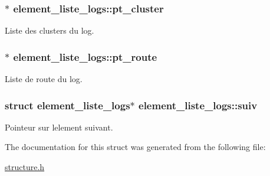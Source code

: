 \subsubsection[{\texorpdfstring{pt\+\_\+cluster}{pt_cluster}}]{$\ast$ element\+\_\+liste\+\_\+logs\+::pt\+\_\+cluster}\hypertarget{structelement__liste__logs_a226ef7e52a9232cc774d08cdcd3f001f}{}\label{structelement__liste__logs_a226ef7e52a9232cc774d08cdcd3f001f}
Liste des clusters du log. 
\subsubsection[{\texorpdfstring{pt\+\_\+route}{pt_route}}]{$\ast$ element\+\_\+liste\+\_\+logs\+::pt\+\_\+route}\hypertarget{structelement__liste__logs_a9391b1f09c709ee42dd329e5dbbe00dd}{}\label{structelement__liste__logs_a9391b1f09c709ee42dd329e5dbbe00dd}
Liste de route du log. 
\subsubsection[{\texorpdfstring{suiv}{suiv}}]{\setlength{\rightskip}{0pt plus 5cm}struct {\bf element\+\_\+liste\+\_\+logs}$\ast$ element\+\_\+liste\+\_\+logs\+::suiv}\hypertarget{structelement__liste__logs_a4b443f8c5ba6c1912ef697fbd1fe90da}{}\label{structelement__liste__logs_a4b443f8c5ba6c1912ef697fbd1fe90da}
Pointeur sur l\textquotesingle{}element suivant. 

The documentation for this struct was generated from the following file\+:\begin{DoxyCompactItemize}
\item 
\hyperlink{structure_8h}{structure.\+h}\end{DoxyCompactItemize}
